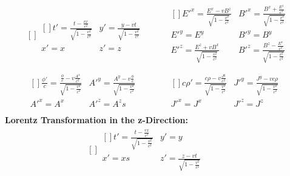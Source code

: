 \documentclass[a4]{article}
\begin{document}
\begin{framed}
\begin{equation}
\begin{aligned}[]
{\begin{aligned}[]
                        t' = \frac{t - \frac{vx}{c^2}}{\sqrt{1 - \frac{v^2}{c^2}}} & y' = \frac{y - vt}{\sqrt{1 - \frac{v^2}{c^2}}} \\
                        x' = x & z' = z
                        \end{aligned}
                } \quad & \quad
                \begin{aligned}[]
                    E'^{x} = \frac{E^{x} - v B^{z}}{\sqrt{1 - \frac{v^2}{c^2}}} & B'^{x} = \frac{B^{x} + \frac{E^z}{c^2}}{\sqrt{1 - \frac{v^2}{c^2}}} \\
                    E'^{y} = E^{y} & B'^{y} = B^{y} \\
                    E'^{z} = \frac{E^{z} + v B^{x}}{\sqrt{1 - \frac{v^2}{c^2}}} & B'^{z} = \frac{B^{z} - \frac{E^x}{c^2}}{\sqrt{1 - \frac{v^2}{c^2}}} \\
                \end{aligned} \\
                \begin{aligned}[]
                    \frac{\phi'}{c} = \frac{\frac{\phi}{c} - v \frac{A^x}{c^2}}{\sqrt{1 - \frac{v^2}{c^2}}} & A'^{y} = \frac{A^y - v \frac{\phi}{c}}{\sqrt{1 - \frac{v^2}{c^2}}} \\
                    A'^{x} = A^{x} & A'^{z} = A^{z}s
                \end{aligned} \quad & \quad
                \begin{aligned}[]
                    c\rho' = \frac{c \rho - v \frac{J^y}{c^2}}{\sqrt{1 - \frac{v^2}{c^2}}} & J'^{y} = \frac{J^y - v c \rho}{\sqrt{1 - \frac{v^2}{c^2}}} \\
                    J'^{x} = J^{x} & J'^{z} = J^{z}
                \end{aligned} \\
            \end{aligned}
        \end{equation}
        \pagebreak
        \textbf{Lorentz Transformation in the z-Direction:}
        \begin{equation}
            \begin{aligned}[]
                \boxed{
                    \begin{aligned}[]
                        t' = \frac{t - \frac{vx}{c^2}}{\sqrt{1 - \frac{v^2}{c^2}}} & y' = y \\
                        x' = xs & z' = \frac{z - vt}{\sqrt{1 - \frac{v^2}{c^2}}}
                        \end{aligned}
                } \quad & \quad

\end{aligned}
\end{equation}
\end{framed}
\end{document}
